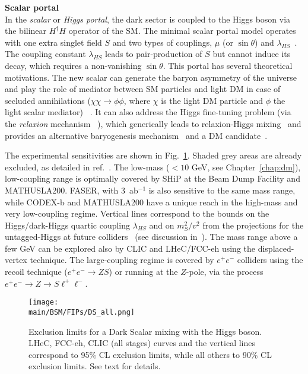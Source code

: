 \documentclass[../report.tex]{subfiles}
\providecommand{\main}{..}
\begin{document}
\vskip 2mm
\noindent
    {\bf Scalar portal} \\
In the {\it scalar} or {\it Higgs portal}, the dark sector is coupled to the Higgs boson via the bilinear $H^{\dagger} H$ operator of the SM. The minimal scalar portal model operates with one extra
singlet field $S$ and two types of couplings, $\mu$ (or $\sin \theta$)  and $\lambda_{HS}$~\cite{OConnell:2006rsp}. 
The coupling constant $\lambda_{HS}$ leads to pair-production of $S$ but cannot induce its decay, which requires a non-vanishing $\sin \theta$.
This portal has several theoretical motivations. The new scalar can generate the baryon asymmetry of the universe~\cite{Cohen:1987vi} and play the role of mediator
between SM particles and light DM in case of secluded annihilations ($\chi \chi \to \phi \phi$, where $\chi$ is the light DM particle and $\phi$ the light scalar mediator) ~\cite{Krnjaic:2015mbs}.
It can also address the Higgs fine-tuning problem (via the {\it relaxion} mechanism ~\cite{Graham:2015cka}), which generically leads to relaxion-Higgs mixing~\cite{Flacke:2016szy} 
and provides an alternative baryogenesis mechanism~\cite{Abel:2018fqg} and a DM candidate~\cite{Fonseca:2018xzp,Banerjee:2018xmn}. 

The experimental sensitivities are shown in Fig.~\ref{fig:FIPs-DarkHiggs}.
Shaded grey areas are already excluded, as detailed in ref.~\cite{Beacham:2019nyx}.
The low-mass ($< 10$ GeV, see Chapter~\ref{chap:dm}), low-coupling range is optimally covered by SHiP at the Beam Dump Facility and MATHUSLA200. FASER, with 3~ab$^{-1}$ is also sensitive to the same mass range, while CODEX-b and MATHUSLA200 have a unique reach in the high-mass and very low-coupling regime. Vertical lines correspond to the bounds on the Higgs/dark-Higgs quartic coupling $\lambda_{HS}$ and on $m^2_S/v^2$ from the projections for the untagged-Higgs at future colliders~\cite{deBlas:2019rxi} (see discussion in~\cite{Frugiuele:2018coc}). The mass range above a few GeV can be explored also by CLIC and LHeC/FCC-eh using the displaced-vertex technique. The large-coupling regime is covered by $e^+ e^-$ colliders using the recoil technique ($e^+ e^- \to Z S$) or running at the $Z$-pole, via the process $e^+ e^- \to Z \to S \ell^+ \ell^-$.

\begin{figure}[htb]
    \centering
    \texttt{[image: \\main/BSM/FIPs/DS\_all.png]}
    \caption{Exclusion limits for a Dark Scalar mixing with the Higgs boson. LHeC, FCC-eh, CLIC (all stages) curves and the vertical lines correspond to 95\% CL exclusion limits, while all others to 90\% CL exclusion limits. See text for details.
    }
    \label{fig:FIPs-DarkHiggs}
\end{figure}
\end{document}

